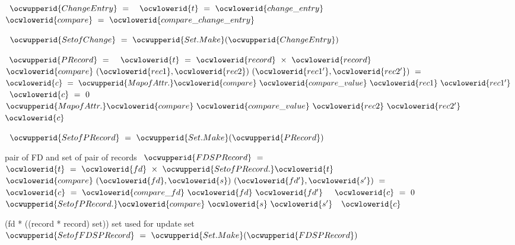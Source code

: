 \documentclass[12pt]{article}
\begin{document}
\label{rellens_types.ml:4596}%
\ocwindent{0.00em}
~$\ocwupperid{ChangeEntry}~=~$\ocweol
\ocwindent{1.00em}
~$\ocwlowerid{t}~=~\ocwlowerid{change\_entry}$\ocweol
\ocwindent{1.00em}
~$\ocwlowerid{compare}~=~\ocwlowerid{compare\_change\_entry}$\ocweol
\ocwindent{0.00em}
\medskip

\label{rellens_types.ml:4690}%
\ocwindent{0.00em}
~$\ocwupperid{SetofChange}~=~\ocwupperid{Set.Make}(\ocwupperid{ChangeEntry})$\medskip

\label{rellens_types.ml:4734}%
\ocwindent{0.00em}
~$\ocwupperid{PRecord}~=~$\ocweol
\ocwindent{1.50em}
~$\ocwlowerid{t}~=~\ocwlowerid{record}~\times{}~\ocwlowerid{record}$\ocweol
\ocwindent{1.00em}
~$\ocwlowerid{compare}~(\ocwlowerid{rec1},\ocwlowerid{rec2})~(\ocwlowerid{rec1'},\ocwlowerid{rec2'})~=~$\ocweol
\ocwindent{2.00em}
~$\ocwlowerid{c}~=~\ocwupperid{MapofAttr.}\ocwlowerid{compare}~\ocwlowerid{compare\_value}~\ocwlowerid{rec1}~\ocwlowerid{rec1'}~$\ocweol
\ocwindent{2.00em}
~$\ocwlowerid{c}~=~0$\ocweol
\ocwindent{2.00em}
~$\ocwupperid{MapofAttr.}\ocwlowerid{compare}~\ocwlowerid{compare\_value}~\ocwlowerid{rec2}~\ocwlowerid{rec2'}~$\ocweol
\ocwindent{2.00em}
~$\ocwlowerid{c}$\ocweol
\ocwindent{0.00em}
\medskip

\label{rellens_types.ml:4970}%
\ocwindent{0.00em}
~$\ocwupperid{SetofPRecord}~=~\ocwupperid{Set.Make}(\ocwupperid{PRecord})$\medskip

\ocwendcode{}\ocwindent{0.00em}
pair of FD and set of pair of records 
\ocweol
\label{rellens_types.ml:5055}%
\medskip
\ocwbegincode{}\ocwindent{0.00em}
~$\ocwupperid{FDSPRecord}~=~$\ocweol
\ocwindent{1.00em}
~$\ocwlowerid{t}~=~\ocwlowerid{fd}~\times{}~\ocwupperid{SetofPRecord.}\ocwlowerid{t}$\ocweol
\ocwindent{1.00em}
~$\ocwlowerid{compare}~(\ocwlowerid{fd},\ocwlowerid{s})~(\ocwlowerid{fd'},\ocwlowerid{s'})~=$\ocweol
\ocwindent{2.00em}
~$\ocwlowerid{c}~=~\ocwlowerid{compare\_fd}~\ocwlowerid{fd}~\ocwlowerid{fd'}~$\ocweol
\ocwindent{2.00em}
~$\ocwlowerid{c}~=~0$\ocweol
\ocwindent{2.00em}
~$\ocwupperid{SetofPRecord.}\ocwlowerid{compare}~\ocwlowerid{s}~\ocwlowerid{s'}$\ocweol
\ocwindent{2.00em}
~$\ocwlowerid{c}$\ocweol
\ocwindent{0.00em}
\medskip

\ocwendcode{}\ocwindent{0.00em}
(fd * ((record * record) set)) set  used for update set 
\ocweol
\label{rellens_types.ml:5308}%
\medskip
\ocwbegincode{}\ocwindent{0.00em}
~$\ocwupperid{SetofFDSPRecord}~=~\ocwupperid{Set.Make}(\ocwupperid{FDSPRecord})$\medskip
\end{document}
